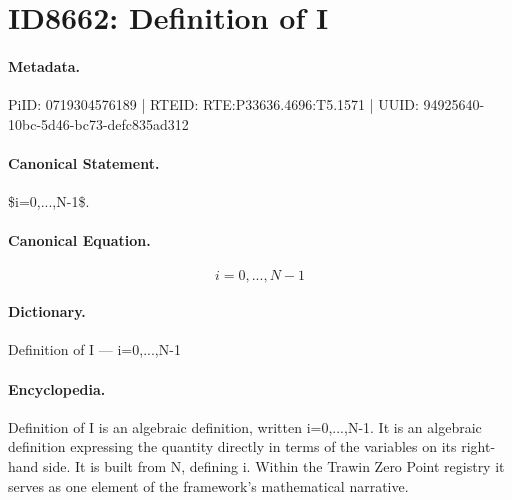 \section*{ID8662: Definition of I}
\paragraph{Metadata.}
PiID: 0719304576189 | RTEID: RTE:P33636.4696:T5.1571 | UUID: 94925640-10bc-5d46-bc73-defc835ad312

\paragraph{Canonical Statement.}
\$i=0,...,N-1\$.

\paragraph{Canonical Equation.}
\[
i=0,...,N-1
\]

\paragraph{Dictionary.}
Definition of I — i=0,...,N-1

\paragraph{Encyclopedia.}
Definition of I is an algebraic definition, written i=0,...,N-1. It is an algebraic definition expressing the quantity directly in terms of the variables on its right-hand side. It is built from N, defining i. Within the Trawin Zero Point registry it serves as one element of the framework's mathematical narrative.

